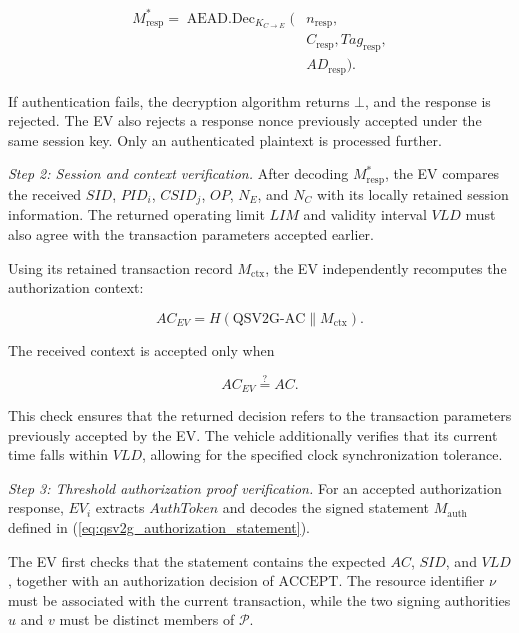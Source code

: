 \documentclass[twocolumn,10pt,journal]{IEEEtran}
\begin{document}
\begin{equation}
\begin{aligned}
M_{\mathrm{resp}}^{*}
=
\operatorname{AEAD.Dec}_{K_{C\to E}}\big(
&n_{\mathrm{resp}},\\
&C_{\mathrm{resp}},
Tag_{\mathrm{resp}},\\
&AD_{\mathrm{resp}}
\big).
\end{aligned}
\label{eq:qsv2g_response_decryption}
\end{equation}

If authentication fails, the decryption algorithm
returns $\bot$, and the response is rejected.
The EV also rejects a response nonce previously
accepted under the same session key. Only an
authenticated plaintext is processed further.

\textit{Step 2: Session and context verification.}
After decoding $M_{\mathrm{resp}}^{*}$, the EV
compares the received $SID$, $PID_i$, $CSID_j$,
$OP$, $N_E$, and $N_C$ with its locally retained
session information. The returned operating
limit $LIM$ and validity interval $VLD$ must
also agree with the transaction parameters
accepted earlier.

Using its retained transaction record
$M_{\mathrm{ctx}}$, the EV independently
recomputes the authorization context:

\begin{equation}
AC_{EV}
=
H\left(
\mathrm{QSV2G\mbox{-}AC}
\parallel M_{\mathrm{ctx}}
\right).
\label{eq:qsv2g_ev_context_verify}
\end{equation}

The received context is accepted only when

\begin{equation}
AC_{EV}\stackrel{?}{=}AC.
\label{eq:qsv2g_ev_context_match}
\end{equation}

This check ensures that the returned decision
refers to the transaction parameters previously
accepted by the EV. The vehicle additionally
verifies that its current time falls within
$VLD$, allowing for the specified clock
synchronization tolerance.

\textit{Step 3: Threshold authorization proof verification.}
For an accepted authorization response, $EV_i$
extracts $AuthToken$ and decodes the signed
statement $M_{\mathrm{auth}}$ defined in
(\ref{eq:qsv2g_authorization_statement}).

The EV first checks that the statement contains
the expected $AC$, $SID$, and $VLD$, together
with an authorization decision of
$\mathrm{ACCEPT}$. The resource identifier
$\nu$ must be associated with the current
transaction, while the two signing authorities
$u$ and $v$ must be distinct members of
$\mathcal{P}$.
\end{document}
